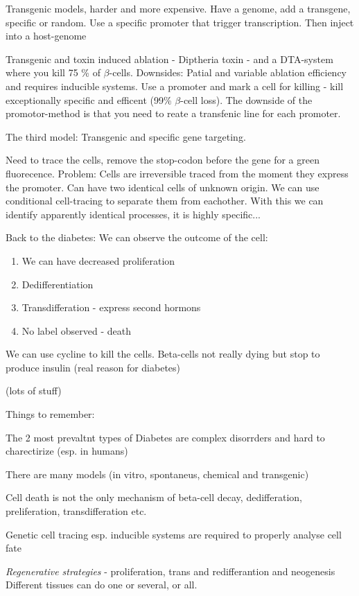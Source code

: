 \documentclass[12p]{article}
\begin{document}
Transgenic models, harder and more expensive.
Have a genome, add a transgene, specific or random. 
Use a specific promoter that trigger transcription. 
Then inject into a host-genome

Transgenic and toxin induced ablation - Diptheria toxin - and a DTA-system where you kill 75 \% of $\beta$-cells.
Downsides: Patial and variable ablation efficiency and requires inducible systems.
Use a promoter and mark a cell for killing - kill exceptionally specific and efficent (99\% $\beta$-cell loss).
The downside of the promotor-method is that you need to reate a transfenic line for each promoter.

The third model: Transgenic and specific gene targeting.

Need to trace the cells, remove the stop-codon before the gene for a green fluorecence.
Problem: Cells are irreversible traced from the moment they express the promoter.
Can have two identical cells of unknown origin.
We can use conditional cell-tracing to separate them from eachother.
With this we can identify apparently identical processes, it is highly specific...

Back to the diabetes:
We can observe the outcome of the cell:

\begin{enumerate}
	\item
	    We can have decreased proliferation
	\item
	    Dedifferentiation
	\item
	    Transdifferation - express second hormons
	\item
	    No label observed - death
\end{enumerate}

We can use cycline to kill the cells.
Beta-cells not really dying but stop to produce insulin (real reason for diabetes)

(lots of stuff)

Things to remember:

The 2 most prevaltnt types of Diabetes are complex disorrders and hard to charectirize (esp. in humans)

There are many models (in vitro, spontaneus, chemical and transgenic)

Cell death is not the only mechanism of beta-cell decay, dedifferation, preliferation, transdifferation etc.

Genetic cell tracing esp. inducible systems are required to properly analyse cell fate

\emph{Regenerative strategies} - proliferation, trans and redifferantion and neogenesis
Different tissues can do one or several, or all.
\end{document}
